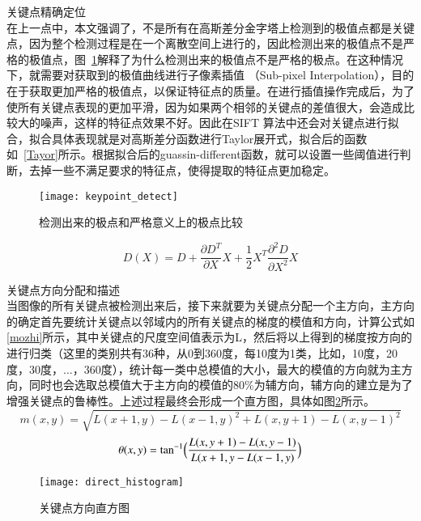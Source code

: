 \begin{compactenum}
\item 关键点精确定位\\在上一点中，本文强调了，不是所有在高斯差分金字塔上检测到的极值点都是关键点，因为整个检测过程是在一个离散空间上进行的，因此检测出来的极值点不是严格的极值点，图~\ref{fig:keypoint_detect}解释了为什么检测出来的极值点不是严格的极点。在这种情况下，就需要对获取到的极值曲线进行子像素插值 （Sub-pixel Interpolation），目的在于获取更加严格的极值点，以保证特征点的质量。在进行插值操作完成后，为了使所有关键点表现的更加平滑，因为如果两个相邻的关键点的差值很大，会造成比较大的噪声，这样的特征点效果不好。因此在SIFT 算法中还会对关键点进行拟合，拟合具体表现就是对高斯差分函数进行Taylor展开式，拟合后的函数如~\ref{Tayor}所示。根据拟合后的guassin-different函数，就可以设置一些阈值进行判断，去掉一些不满足要求的特征点，使得提取的特征点更加稳定。
\begin{figure}[htp]
\centering
\texttt{[image: keypoint\_detect]}
\caption{检测出来的极点和严格意义上的极点比较}
\label{fig:keypoint_detect}
\end{figure}


\begin{equation}\label{Tayor}
D(X)=D+\frac{\partial{D}^T}{\partial{X}}X+\frac{1}{2}X^T\frac{\partial^2{D}}{\partial{X}^2}X
\end{equation}

\item 关键点方向分配和描述\\当图像的所有关键点被检测出来后，接下来就要为关键点分配一个主方向，主方向的确定首先要统计关键点以邻域内的所有关键点的梯度的模值和方向，计算公式如\ref{mozhi}所示，其中关键点的尺度空间值表示为L，然后将以上得到的梯度按方向的进行归类（这里的类别共有36种，从0到360度，每10度为1类，比如，10度，20度，30度，...，360度），统计每一类中总模值的大小，最大的模值的方向就为主方向，同时也会选取总模值大于主方向的模值的80\%为辅方向，辅方向的建立是为了增强关键点的鲁棒性。上述过程最终会形成一个直方图，具体如图\ref{fig:direct_histogram}所示。
\begin{equation}\label{mozhi}
m(x,y)=\sqrt{L(x+1,y)-{L(x-1,y)}^2+L(x,y+1)-{L(x,y-1)}^2}
\end{equation}
\begin{equation}\label{fangxiang}
\theta(x,y)=\tan^{-1}\Bigl({\frac{L(x,y+1)-L(x,y-1)}{L(x+1,y-L(x-1,y)}}\Bigr)
\end{equation}
\end{compactenum}

\begin{figure}[htp]
\centering
\texttt{[image: direct\_histogram]}
\caption{关键点方向直方图}
\label{fig:direct_histogram}
\end{figure}

